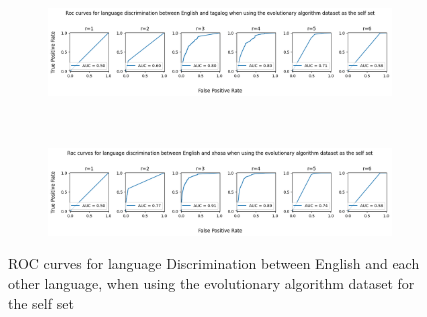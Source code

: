 \documentclass{article}
\begin{document}
\begin{figure}[ht]
\begin{subfigure}[t]{\linewidth}
        \label{fig:eng_mid_pla_ea}
    \end{subfigure}
    \\
    \begin{subfigure}[t]{\linewidth}
        \centering
        \includegraphics[width=\linewidth]{images/english_tagalog_ea.png}
        \label{fig:eng_mid_tag_ea}
    \end{subfigure}
        \\
    \begin{subfigure}[t]{\linewidth}
        \centering
        \includegraphics[width=\linewidth]{images/english_xhosa_ea.png}
        \label{fig:eng_xho_ea}
    \end{subfigure}
    
    \caption{ROC curves for language Discrimination between English and each other language, when using the evolutionary algorithm dataset for the self set}
    \label{fig:langs_ea}
\end{figure}
\end{document}
